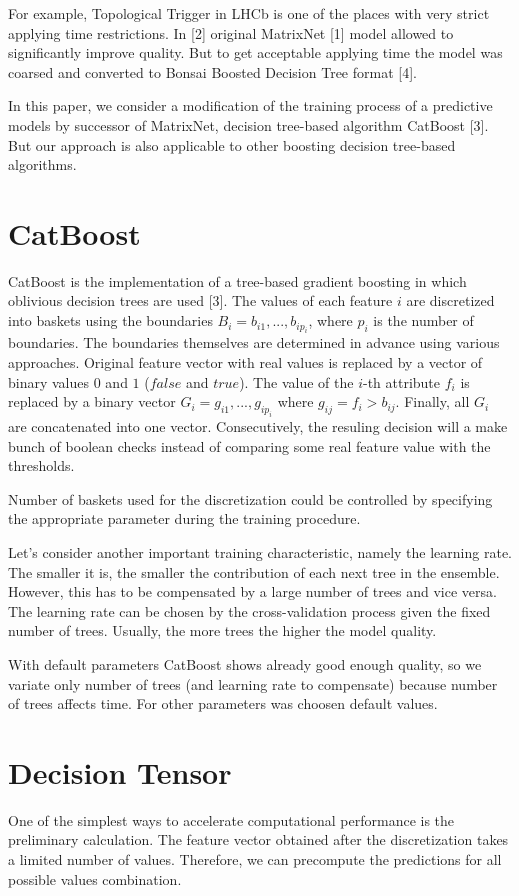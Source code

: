 \documentclass[a4paper]{jpconf}
\begin{document}
For example, Topological Trigger in LHCb is one of the places with very strict applying time restrictions. In [2] original MatrixNet [1] model allowed to significantly improve quality. But to get acceptable applying time the model was coarsed and converted to Bonsai Boosted Decision Tree format [4].

In this paper, we consider a modification of the training process of a predictive models by successor of MatrixNet, decision tree-based algorithm CatBoost [3]. But our approach is also applicable to other boosting decision tree-based algorithms.

\section{CatBoost}

CatBoost is the implementation of a tree-based gradient boosting in which oblivious decision trees are used [3]. The values of each feature $i$ are discretized into baskets using the boundaries $B_i={b_{i1},...,b_{ip_i}}$, where $p_i$ is the number of boundaries. The boundaries themselves are determined in advance using various approaches.
Original feature vector with real values is replaced by a vector of binary values $0$ and $1$ ($false$ and $true$). The value of the $i$-th attribute $f_i$ is replaced by a binary vector $G_i={g_{i1},...,g_{ip_i}}$ where $g_{ij} = f_i > b_{ij}$. Finally, all $G_i$ are concatenated into one vector. Consecutively, the resuling decision will a make bunch of boolean checks instead of comparing some real feature value with the thresholds.

Number of baskets used for the discretization could be controlled by specifying the appropriate parameter during the training procedure.

Let's consider another important training characteristic, namely the learning rate. The smaller it is, the smaller the contribution of each next tree in the ensemble. However, this has to be compensated by a large number of trees and vice versa. The learning rate can be chosen by the cross-validation process given the fixed number of trees. Usually, the more trees the higher the model quality.

With default parameters CatBoost shows already good enough quality, so we variate only number of trees (and learning rate to compensate) because number of trees affects time. For other parameters was choosen default values.

\section{Decision Tensor}
One of the simplest ways to accelerate computational performance is the preliminary calculation. The feature vector obtained after the discretization takes a limited number of values. Therefore, we can precompute the predictions for all possible values combination.
\end{document}
